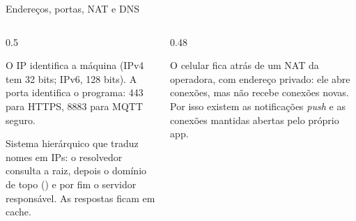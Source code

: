 \begin{frame}{Endereços, portas, NAT e DNS}
  \begin{columns}[T]
    \begin{column}{0.5\textwidth}
      \begin{definicao}
        O IP identifica a máquina (IPv4 tem 32 bits; IPv6, 128 bits). A porta identifica o programa: 443 para HTTPS, 8883 para MQTT seguro.
      \end{definicao}
      \begin{definicao}[DNS]
        Sistema hierárquico que traduz nomes em IPs: o resolvedor consulta a raiz, depois o domínio de topo () e por fim o servidor responsável. As respostas ficam em cache.
      \end{definicao}
    \end{column}
    \begin{column}{0.48\textwidth}
      \centering
      \raggedright
      \begin{pordentro}
        O celular fica atrás de um NAT da operadora, com endereço privado: ele abre conexões, mas não recebe conexões novas. Por isso existem as notificações \emph{push} e as conexões mantidas abertas pelo próprio app.
      \end{pordentro}
    \end{column}
  \end{columns}
\end{frame}

